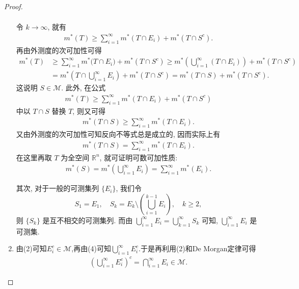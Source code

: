 \documentclass[../../main.tex]{subfiles}
\begin{document}
\begin{proof}
\begin{enumerate}[(1)]
\begin{align*}
\end{align*}
令 \(k \to \infty\), 就有
\begin{align*}
m^*(T) \geq \sum_{i = 1}^{\infty} m^*(T \cap E_i) + m^*(T \cap S^c).
\end{align*}
再由外测度的次可加性可得
\begin{align*}
m^*(T)&\geqslant \sum_{i=1}^{\infty}{m^*(T}\cap E_i)+m^*(T\cap S^c)\geqslant m^*(\bigcup_{i=1}^{\infty}{\left( T\cap E_i \right)})+m^*(T\cap S^c)
\\
&=m^*(T\cap \bigcup_{i=1}^{\infty}{E_i})+m^*(T\cap S^c)=m^*(T\cap S)+m^*(T\cap S^c).
\end{align*}
这说明 \(S \in \mathscr{M}\).
此外, 在公式
\begin{align*}
m^*(T) \geq \sum_{i = 1}^{\infty} m^*(T \cap E_i) + m^*(T \cap S^c)
\end{align*}
中以 \(T \cap S\) 替换 \(T\), 则又可得
\begin{align*}
m^*(T \cap S) \geq \sum_{i = 1}^{\infty} m^*(T \cap E_i).
\end{align*}
又由外测度的次可加性可知反向不等式总是成立的, 因而实际上有
\begin{align*}
m^*(T \cap S) = \sum_{i = 1}^{\infty} m^*(T \cap E_i).
\end{align*}
在这里再取 \(T\) 为全空间 \(\mathbb{R}^n\), 就可证明可数可加性质:
\begin{align*}
m^*(S) = m^*\left(\bigcup_{i = 1}^{\infty} E_i\right) = \sum_{i = 1}^{\infty} m^*(E_i).
\end{align*}

其次, 对于一般的可测集列 \(\{E_i\}\), 我们令
\[
S_1 = E_1, \quad S_k = E_k \setminus \left(\bigcup_{i = 1}^{k - 1} E_i\right), \quad k \geq 2,
\]
则 \(\{S_k\}\) 是互不相交的可测集列. 而由 \(\bigcup_{i = 1}^{\infty} E_i = \bigcup_{k = 1}^{\infty} S_k\) 可知, \(\bigcup_{i = 1}^{\infty} E_i\) 是可测集.

\item 由(2)可知$E_i^c\in \mathscr{M}$,再由(4)可知$\bigcup_{i = 1}^{\infty} E_i^c$.于是再利用(2)和De Morgan定律可得
\begin{align*}
\left( \bigcup_{i=1}^{\infty}{E_{i}^{c}} \right) ^c=\bigcap_{i=1}^{\infty}{E_i}\in \mathscr{M} .
\end{align*}


\end{enumerate}
\end{proof}
\end{document}
